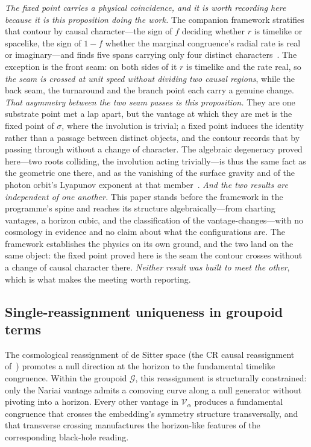 \documentclass[11pt,a4paper]{article}
\theoremstyle{definition}
\begin{document}
\noindent\emph{The fixed point carries a physical coincidence, and it is worth recording
here because it is this proposition doing the work.} The companion framework stratifies that contour by causal
character---the sign of $f$ deciding whether $r$ is timelike or spacelike, the sign of $1-f$ whether the
marginal congruence's radial rate is real or imaginary---and finds five spans carrying only four distinct
characters~\cite{JanzenCRframework}. The exception is the front seam: on both sides of it $r$ is timelike and
the rate real, so \emph{the seam is crossed at unit speed without dividing two causal regions}, while the back
seam, the turnaround and the branch point each carry a genuine change. \emph{That asymmetry between the two seam
passes is this proposition.} They are one substrate point met a lap apart, but the vantage at which they are met
is the fixed point of $\sigma$, where the involution is trivial; a fixed point induces the identity rather than
a passage between distinct objects, and the contour records that by passing through without a change of
character. The algebraic degeneracy proved here---two roots colliding, the involution acting trivially---is thus
the same fact as the geometric one there, and as the vanishing of the surface gravity and of the photon orbit's
Lyapunov exponent at that member~\cite{Cardoso2009}. \emph{And the two results are independent of one another.} This paper stands before the framework in the programme's spine and reaches its structure algebraically---from charting vantages, a horizon cubic, and the classification of the vantage-changes---with no cosmology in evidence and no claim about what the configurations are. The framework establishes the physics on its own ground, and the two land on the same object: the fixed point proved here is the seam the contour crosses without a change of causal character there. \emph{Neither result was built to meet the other}, which is what makes the meeting worth reporting.

\subsection{Single-reassignment uniqueness in groupoid terms}\label{sec:single-groupoid}

The cosmological reassignment of de Sitter space (the CR causal reassignment of~\cite{JanzenCRframework}) promotes a null direction at the horizon to the fundamental timelike congruence. Within the groupoid $\mathcal{G}$, this reassignment is structurally constrained: only the Nariai vantage admits a comoving curve along a null generator without pivoting into a horizon. Every other vantage in $\mathcal{V}_{\alpha}$ produces a fundamental congruence that crosses the embedding's symmetry structure transversally, and that transverse crossing manufactures the horizon-like features of the corresponding black-hole reading.
\end{document}
